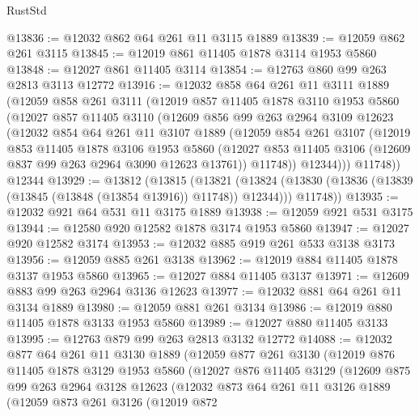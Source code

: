 \begin{lexlean}{RustStd}
\begin{coremodule}
{\begin{coremodule}
{{{{{{{{{{{{{{{{{{{{{{{{{{{{{@13836 := @12032 @862 @64 @261 @11 @3115 @1889
@13839 := @12059 @862 @261 @3115
@13845 := @12019 @861 @11405 @1878 @3114 @1953 @5860
@13848 := @12027 @861 @11405 @3114
@13854 := @12763 @860 @99 @263 @2813 @3113 @12772
@13916 := @12032
    @858
    @64
    @261
    @11
    @3111
    @1889
    (@12059
      @858
      @261
      @3111
      (@12019
        @857
        @11405
        @1878
        @3110
        @1953
        @5860
        (@12027
          @857
          @11405
          @3110
          (@12609
            @856
            @99
            @263
            @2964
            @3109
            @12623
            (@12032
              @854
              @64
              @261
              @11
              @3107
              @1889
              (@12059
                @854
                @261
                @3107
                (@12019
                  @853
                  @11405
                  @1878
                  @3106
                  @1953
                  @5860
                  (@12027 @853 @11405 @3106 (@12609 @837 @99 @263 @2964 @3090 @12623 @13761))
                  @11748))
              @12344)))
        @11748))
    @12344
@13929 := @13812
    (@13815
      (@13821
        (@13824 (@13830 (@13836 (@13839 (@13845 (@13848 (@13854 @13916)) @11748)) @12344)))
        @11748))
@13935 := @12032 @921 @64 @531 @11 @3175 @1889
@13938 := @12059 @921 @531 @3175
@13944 := @12580 @920 @12582 @1878 @3174 @1953 @5860
@13947 := @12027 @920 @12582 @3174
@13953 := @12032 @885 @919 @261 @533 @3138 @3173
@13956 := @12059 @885 @261 @3138
@13962 := @12019 @884 @11405 @1878 @3137 @1953 @5860
@13965 := @12027 @884 @11405 @3137
@13971 := @12609 @883 @99 @263 @2964 @3136 @12623
@13977 := @12032 @881 @64 @261 @11 @3134 @1889
@13980 := @12059 @881 @261 @3134
@13986 := @12019 @880 @11405 @1878 @3133 @1953 @5860
@13989 := @12027 @880 @11405 @3133
@13995 := @12763 @879 @99 @263 @2813 @3132 @12772
@14088 := @12032
    @877
    @64
    @261
    @11
    @3130
    @1889
    (@12059
      @877
      @261
      @3130
      (@12019
        @876
        @11405
        @1878
        @3129
        @1953
        @5860
        (@12027
          @876
          @11405
          @3129
          (@12609
            @875
            @99
            @263
            @2964
            @3128
            @12623
            (@12032
              @873
              @64
              @261
              @11
              @3126
              @1889
              (@12059
                @873
                @261
                @3126
                (@12019
                  @872
}}}}}}}}}}}}}}}}}}}}}}}}}}}}}
\end{coremodule}}
\end{coremodule}
\end{lexlean}
